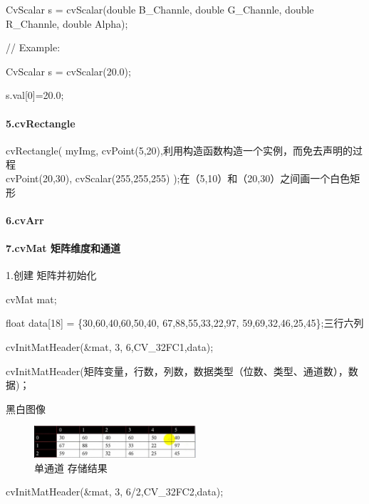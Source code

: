 \documentclass[UTF8,a4paper,8pt]{ctexart}
\begin{document}
    CvScalar s = cvScalar(double B\_Channle, double G\_Channle, double R\_Channle, double Alpha);
    
    // Example: 
    
    CvScalar s = cvScalar(20.0);
    
    s.val[0]=20.0;
    
    \paragraph{5.cvRectangle} 
       cvRectangle(\newline
        myImg,\newline
        cvPoint(5,20),利用构造函数构造一个实例，而免去声明的过程\\
        cvPoint(20,30),\newline
        cvScalar(255,255,255)\newline
      );在（5,10）和（20,30）之间画一个白色矩形
      
    \paragraph{6.cvArr} 
    
    
    \paragraph{7.cvMat 矩阵维度和通道}
    1.创建 矩阵并初始化
    
    cvMat mat;
    
    float data[18] = \{30,60,40,60,50,40,    67,88,55,33,22,97,   59,69,32,46,25,45\};三行六列
    
    cvInitMatHeader(\&mat,      3,     6,CV\_32FC1,data); 
    
    cvInitMatHeader(矩阵变量，行数，列数，数据类型（位数、类型、通道数），数据)；
    
    黑白图像
        \begin{figure}[h] 	
        	\centering
        	\includegraphics[width=6cm,clip]{singleChannle.png} 	
        	\caption{单通道 存储结果}	
        	\label{fig:myphoto}
        \end{figure} 
        
                cvInitMatHeader(\&mat,      3,     6/2,CV\_32FC2,data); 
                
\end{document}
